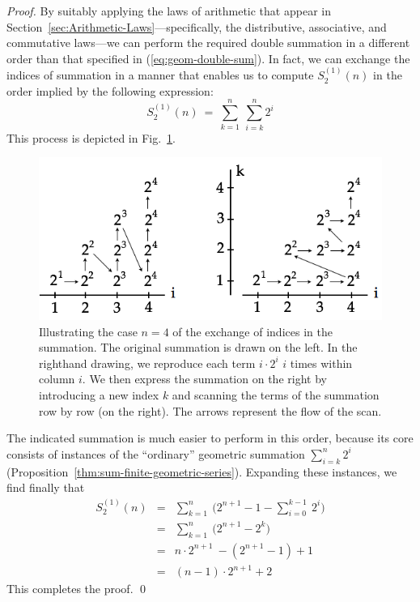 \begin{proof}
By suitably applying the laws of arithmetic that appear in Section~\ref{sec:Arithmetic-Laws}---specifically, the distributive, associative, and commutative laws---we can perform the required double summation in a different order than that specified in (\ref{eq:geom-double-sum}).  In fact, we can exchange the indices of summation in a manner that enables us to compute $S_2^{(1)}(n)$ in the order implied by the following expression:
\[
S_2^{(1)}(n) \ = \ \sum_{k=1}^{n} \ \sum_{i=k}^{n} 2^i
\]
This process is depicted in Fig.~\ref{fig:Sumi2i}.
\begin{figure}[htb]
\centerline{
\includegraphics[scale=0.35]{FiguresMaths/Sumi2i}
}
\caption{Illustrating the case $n=4$ of the exchange of indices in the summation.  The original summation is drawn on the left.  In the righthand drawing, we reproduce each term $i \cdot 2^i$ $i$ times within column $i$.  We then express the summation on the right by introducing a new index $k$ and scanning the terms of the summation row by row (on the right).  The arrows represent the flow of the scan.}
\label{fig:Sumi2i}
\end{figure}
The indicated summation is much easier to perform in this order,
because its core consists of instances of the ``ordinary'' geometric
summation $\sum_{i=k}^{n} 2^i$ (Proposition~\ref{thm:sum-finite-geometric-series}).  Expanding these instances, we find finally that
\begin{eqnarray*}
S_2^{(1)}(n)
  & = &
\sum_{k=1}^{n} \ \big( 2^{n+1} -1 - \sum_{i=0}^{k-1} \ 2^i \big) \\
  & = &
\sum_{k=1}^{n} \ \big( 2^{n+1} - 2^k \big) \\
  & = &
n \cdot 2^{n+1}\ - ( 2^{n+1} -1) +1 \\
  & = &
(n-1) \cdot 2^{n+1} +2
\end{eqnarray*}
This completes the proof.  \qed
\end{proof}

